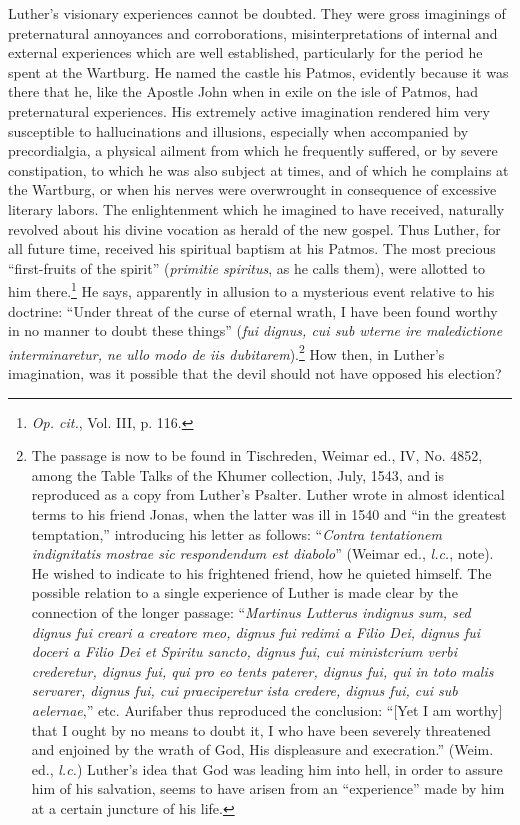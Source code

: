 Luther’s visionary experiences cannot be doubted. They were gross
imaginings of preternatural annoyances and corroborations, misinterpretations
of internal and external experiences which are well established, particularly
for the period he spent at the Wartburg. He
named the castle his Patmos, evidently because it was there that he,
like the Apostle John when in exile on the isle of Patmos, had
preternatural experiences. His extremely active imagination rendered him
very susceptible to hallucinations and illusions, especially
when accompanied by precordialgia, a physical ailment from which
he frequently suffered, or by severe constipation, to which he was
also subject at times, and of which he complains at the Wartburg, or
when his nerves were overwrought in consequence of excessive literary labors.
The enlightenment which he imagined to have received, naturally
revolved about his divine vocation as herald of the new gospel. Thus
Luther, for all future time, received his spiritual baptism at his Patmos.
The most precious “first-fruits of the spirit” (\textit{primitie spiritus},
as he calls them), were allotted to him there.\footnote{\textit{Op. cit.}, Vol. III, p. 116.}
He says, apparently
in allusion to a mysterious event relative to his doctrine: “Under
threat of the curse of eternal wrath, I have been found worthy in no
manner to doubt these things” (\textit{fui dignus, cui sub wterne ire maledictione
interminaretur, ne ullo modo de iis dubitarem}).\footnote
{The passage is now to be found in Tischreden, Weimar ed., IV, No. 4852, among the
Table Talks of the Khumer collection, July, 1543, and is reproduced as a copy from
Luther’s Psalter. Luther wrote in almost identical terms to his friend Jonas, when the latter
was ill in 1540 and “in the greatest temptation,” introducing his letter as follows: “\textit{Contra
tentationem indignitatis mostrae sic respondendum est diabolo}” (Weimar ed., \textit{l.c.}, note). He
wished to indicate to his frightened friend, how he quieted himself. The possible relation
to a single experience of Luther is made clear by the connection of the longer passage:
“\textit{Martinus Lutterus indignus sum, sed dignus fui creari a creatore meo, dignus fui redimi a
Filio Dei, dignus fui doceri a Filio Dei et Spiritu sancto, dignus fui, cui ministcrium verbi
crederetur, dignus fui, qui pro eo tents paterer, dignus fui, qui in toto malis servarer,
dignus fui, cui praeciperetur ista credere, dignus fui, cui sub aelernae},” etc. Aurifaber thus
reproduced the conclusion: “[Yet I am worthy] that I ought by no means to doubt it, I
who have been severely threatened and enjoined by the wrath of God, His displeasure and
execration.” (Weim. ed., \textit{l.c.}) Luther’s idea that God was leading him into hell, in order to
assure him of his salvation, seems to have arisen from an “experience” made by him at a
certain juncture of his life.}
How then,
in Luther’s imagination, was it possible that the devil should not have
opposed his election?

